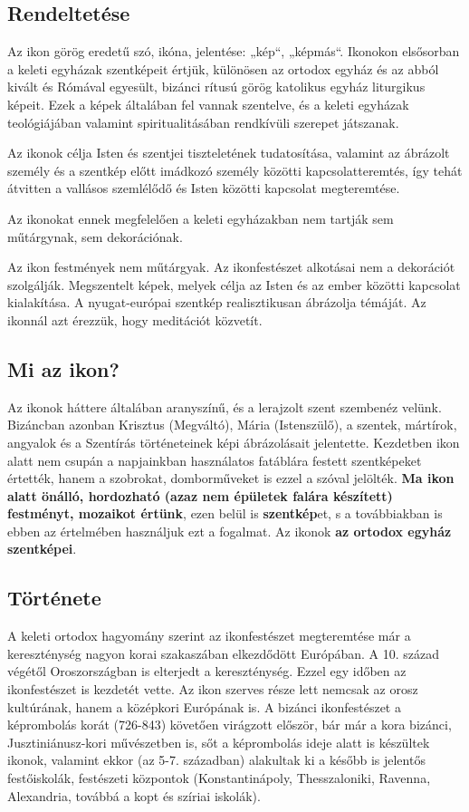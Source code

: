 \subsection*{Rendeltetése}

Az ikon görög eredetű szó, ikóna, jelentése: „kép“, „képmás“. Ikonokon elsősorban a keleti egyházak szentképeit értjük, különösen az ortodox egyház és az abból kivált és Rómával egyesült, bizánci rítusú görög katolikus egyház liturgikus képeit. Ezek a képek általában fel vannak szentelve, és a keleti egyházak teológiájában valamint spiritualitásában rendkívüli szerepet játszanak.

Az ikonok célja Isten és szentjei tiszteletének tudatosítása, valamint az ábrázolt személy és a szentkép előtt imádkozó személy közötti kapcsolatteremtés, így tehát átvitten a vallásos szemlélődő és Isten közötti kapcsolat megteremtése.

Az ikonokat ennek megfelelően a keleti egyházakban nem tartják sem műtárgynak, sem dekorációnak.

Az ikon festmények nem műtárgyak. Az ikonfestészet alkotásai nem a dekorációt szolgálják. Megszentelt képek, melyek célja az Isten és az ember közötti kapcsolat kialakítása. A nyugat-európai szentkép realisztikusan ábrázolja témáját. Az ikonnál azt érezzük, hogy meditációt közvetít.

\subsection*{Mi az ikon?}

Az ikonok háttere általában aranyszínű, és a lerajzolt szent szembenéz velünk. Bizáncban azonban Krisztus (Megváltó), Mária (Istenszülő), a szentek, mártírok, angyalok és a Szentírás történeteinek képi ábrázolásait jelentette. Kezdetben ikon alatt nem csupán a napjainkban használatos fatáblára festett szentképeket értették, hanem a szobrokat, domborműveket is ezzel a szóval jelölték. \textbf{Ma ikon alatt önálló, hordozható (azaz nem épületek falára készített) festményt, mozaikot értünk}, ezen belül is \textbf{szentkép}et, s a továbbiakban is ebben az értelmében használjuk ezt a fogalmat. Az ikonok \textbf{az ortodox egyház szentképei}.

\subsection*{Története}

A keleti ortodox hagyomány szerint az ikonfestészet megteremtése már a kereszténység nagyon korai szakaszában elkezdődött Európában. A 10. század végétől Oroszországban is elterjedt a kereszténység. Ezzel egy időben az ikonfestészet is kezdetét vette. Az ikon szerves része lett nemcsak az orosz kultúrának, hanem a középkori Európának is. A bizánci ikonfestészet a képrombolás korát (726-843) követően virágzott először, bár már a kora bizánci, Jusztiniánusz-kori művészetben is, sőt a képrombolás ideje alatt is készültek ikonok, valamint ekkor (az 5-7. században) alakultak ki a később is jelentős festőiskolák, festészeti központok (Konstantinápoly, Thesszaloniki, Ravenna, Alexandria, továbbá a kopt és szíriai iskolák).

